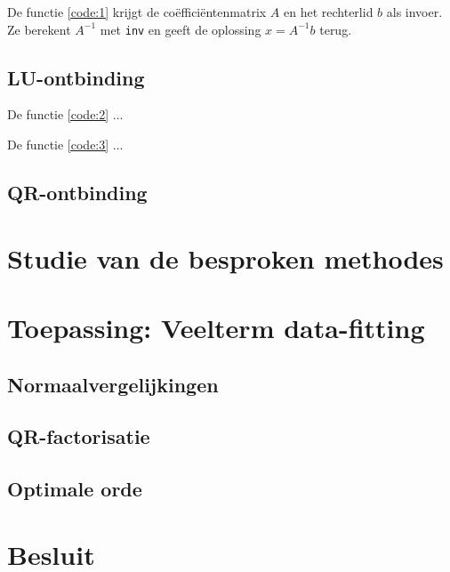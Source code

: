 \documentclass{kulakarticle}
\begin{document}
	
	
	 De functie \ref{code:1} krijgt de coëfficiëntenmatrix \(A\) en
	het rechterlid \(b\) als invoer. Ze berekent \(A^{-1}\) met \texttt{inv}
	en geeft de oplossing \(x = A^{-1}b\) terug.
	
	
	
	\subsection{LU-ontbinding}
	
	De functie \ref{code:2} ...
	
	De functie \ref{code:3} ...
	
	
	
	
	
	
	\subsection{QR-ontbinding}
	
	
	
	\section{Studie van de besproken methodes}
	
	
	
	\section{Toepassing: Veelterm data-fitting}
	
	\subsection{Normaalvergelijkingen}

	\subsection{QR-factorisatie}
	
	
	\subsection{Optimale orde}
	
	
	
	\section{Besluit}
	
	
	
	
	
\end{document}
